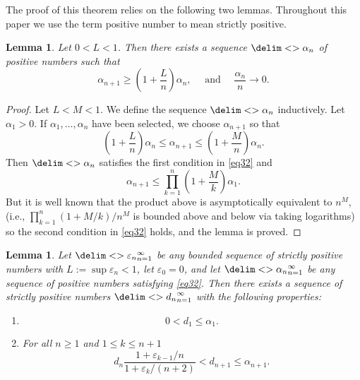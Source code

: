 \documentclass[10pt,reqno]{amsart}
\newtheorem{lemma}[theorem]{Lemma}
\theoremstyle{remark}
\newcommand{\seq}{\delim<>}
\numberwithin{equation}{section}
\begin{document}
The proof of this theorem relies on the following two lemmas.
Throughout this paper we use the term positive number to mean strictly positive.
\begin{lemma}
  Let $0<L<1$.
  Then there exists a sequence $\seq{\alpha_n}$ of positive numbers such that
  \begin{equation}
    \label{eq32}
    \alpha_{n+1}\ge \left(1+\dfrac{L}{n}\right)\alpha_n,\quad\mbox{ and }\quad \dfrac{\alpha_n}{n}\to 0.
  \end{equation}
\end{lemma}
\begin{proof}
  Let $L<M<1$.
  We define the sequence $\seq{\alpha_n}$ inductively.
  Let $\alpha_1>0$.
  If $\alpha_1,\dots,\alpha_n$ have been selected, we choose $\alpha_{n+1}$ so that
  \begin{equation*}
    \left(1+\dfrac{L}{n}\right)\alpha_n \le \alpha_{n+1}\le \left(1+\dfrac{M}{n}\right)\alpha_n.
  \end{equation*}
  Then $\seq{\alpha_n}$ satisfies the first condition in \eqref{eq32} and
  \begin{equation*}
    \alpha_{n+1}\le \prod_{k=1}^n\left(1+\dfrac{M}{k}\right)\alpha_1.
  \end{equation*}
  But it is well known that the product above is asymptotically equivalent to $n^M$, (i.e., $\prod_{k=1}^n\left(1+{M}/{k}\right)/n^M$ is bounded above and below via taking logarithms) so the second condition in \eqref{eq32} holds, and the lemma is proved.
\end{proof}

\begin{lemma}
  \label{lemma2.7new}
  Let $\seq{\varepsilon_n}_{n=1}^\infty$ be any bounded sequence of strictly positive numbers with $L:=\sup \varepsilon_n<1$, let $\varepsilon_0=0$, and let $\seq{\alpha_n}_{n=1}^\infty$ be any sequence of positive numbers satisfying \eqref{eq32}.
  Then there exists a sequence of strictly positive numbers $\seq{d_n}_{n=1}^\infty$ with the following properties:
  \begin{enumerate}
  \item
    \begin{equation}
      \label{eq89}
      0<d_1\le\alpha_1.
    \end{equation}
  \item For all $n\ge 1$ and $1\le k\le n+1$
    \begin{equation}
      \label{eq22}
      d_n \dfrac{1+\varepsilon_{k-1}/n}{1+\varepsilon_{k}/(n+2)}<d_{n+1}\le \alpha_{n+1}.
    \end{equation}
  \end{enumerate}
\end{lemma}
\end{document}

